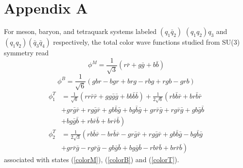 \documentclass[prd,twocolumn,floatfix,nofootinbib]{revtex4}
\begin{document}
\section*{Appendix A}\label{AppendixA}
\setcounter{equation}{0}
\renewcommand{\theequation}{A\arabic{equation}}
For meson, baryon, and tetraquark systems labeled $(q_{1}\bar{q}_{2})$ $(q_{1}q_{2})q_{3}$ and $(q_{1}q_{2})(\bar{q}_{3}\bar{q}_{4})$ respectively, 
the total color wave functions studied from SU(3) symmetry read
\begin{equation}\label{pcolorM}
    \phi^{M}=\frac{1}{\sqrt{3}} \left(r\bar{r}+g\bar{g}+b\bar{b} \right)
\end{equation}
\begin{equation}\label{pcolorB}
    \phi^{B}=\frac{1}{\sqrt{6}} \left(gbr-bgr+brg-rbg+rgb-grb \right)
\end{equation}
\begin{equation}\label{pcolorT}
    \begin{aligned}
        \phi_{1}^{T}&=\frac{1}{\sqrt{6}} \left(rr\bar{r}\bar{r}+gg\bar{g}\bar{g}+bb\bar{b}\bar{b} \right)
        +\frac{1}{2\sqrt{6}} \left(rb\bar{b}\bar{r}+br\bar{b}\bar{r} \right.\\ 
        &\left. +gr\bar{g}\bar{r}+rg\bar{g}\bar{r}+gb\bar{b}\bar{g}+bg\bar{b}\bar{g}+gr\bar{r}\bar{g}+rg\bar{r}\bar{g}+gb\bar{g}\bar{b} \right. \\
        &\left. +bg\bar{g}\bar{b}+rb\bar{r}\bar{b}+br\bar{r}\bar{b} \right) \\ 
        \phi_{2}^{T}&=\frac{1}{2\sqrt{3}} \left(rb\bar{b}\bar{r}-br\bar{b}\bar{r}-gr\bar{g}\bar{r}+rg\bar{g}\bar{r}+gb\bar{b}\bar{g}-bg\bar{b}\bar{g} \right.\\
        &\left. +gr\bar{r}\bar{g}-rg\bar{r}\bar{g}-gb\bar{g}\bar{b}+bg\bar{g}\bar{b}-rb\bar{r}\bar{b}+br\bar{r}\bar{b}\right)
    \end{aligned}
\end{equation}
associated with states (\ref{colorM}), (\ref{colorB}) and (\ref{colorT}).
\end{document}
